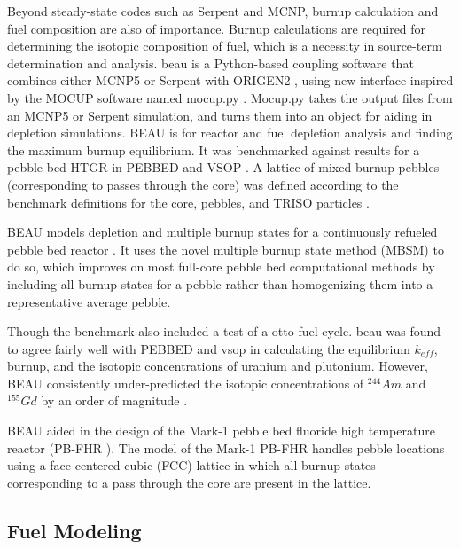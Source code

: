 Beyond steady-state codes such as Serpent and MCNP, burnup calculation and fuel composition are also of importance.  Burnup calculations are required for determining the isotopic composition of fuel, which is a necessity in source-term determination and analysis. \acrfull{beau} is a Python-based coupling software that combines either MCNP5 or Serpent with ORIGEN2 \cite{croff_origen2_1983}, using new interface inspired by the MOCUP \cite{babcock_mocup_1995} software named mocup.py \cite{cisneros_pebble_2013}.  Mocup.py takes the output files from an MCNP5 or Serpent simulation, and turns them into an object for aiding in depletion simulations.  BEAU is for reactor and fuel depletion analysis and finding the maximum burnup equilibrium.  It was benchmarked against results for a pebble-bed HTGR in PEBBED \cite{terry_direct_2002} and VSOP \cite{ruetten_vsop_2005}.  A lattice of mixed-burnup pebbles (corresponding to passes through the core) was defined according to the benchmark definitions for the core, pebbles, and TRISO particles \cite{cisneros_pebble_2013}.


BEAU models depletion and multiple burnup states for a continuously refueled pebble bed reactor \cite{cisneros_pebble_2013}. It uses the novel multiple burnup state method (MBSM) to do so, which improves on most full-core pebble bed computational methods by including all burnup states for a pebble rather than homogenizing them into a representative average pebble.


Though the benchmark also included a test of a \acrfull{otto} fuel cycle.  \acrshort{beau} was found to agree fairly well with PEBBED and \acrshort{vsop} in calculating the equilibrium $k_{eff}$, burnup, and the isotopic concentrations of uranium and plutonium.  However, BEAU consistently under-predicted the isotopic concentrations of $^{244}Am$ and $^{155}Gd$ by an order of magnitude \cite{cisneros_pebble_2013}.

BEAU aided in the design of the Mark-1 pebble bed fluoride high temperature reactor (PB-FHR \cite{cisneros_pebble_2013}).  The model of the Mark-1 PB-FHR handles pebble locations using a face-centered cubic (FCC) lattice in which all burnup states corresponding to a pass through the core are  present in the lattice.


\subsection{Fuel Modeling}

